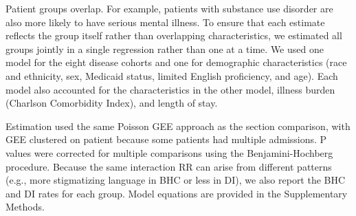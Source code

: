 \documentclass[unnumsec,webpdf,contemporary,large]{oup-authoring-template}
\newcommand{\td}[1]{\sethlcolor{pink}\hl{[Ting: #1]}}
\begin{document}
Patient groups overlap. For example, patients with substance use disorder are also more likely to have serious mental illness. To ensure that each estimate reflects the group itself rather than overlapping characteristics, we estimated all groups jointly in a single regression rather than one at a time. We used one model for the eight disease cohorts and one for demographic characteristics (race and ethnicity, sex, Medicaid status, limited English proficiency, and age). Each model also accounted for the characteristics in the other model, illness burden (Charlson Comorbidity Index),\cite{charlson1987,quan2005} and length of stay.

Estimation used the same Poisson GEE approach as the section comparison, with GEE clustered on patient because some patients had multiple admissions. P values were corrected for multiple comparisons using the Benjamini-Hochberg procedure.\cite{benjamini1995} Because the same interaction RR can arise from different patterns (e.g., more stigmatizing language in BHC or less in DI), we also report the BHC and DI rates for each group. Model equations are provided in the Supplementary Methods.

\end{document}
